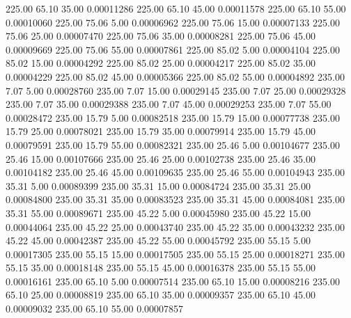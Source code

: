     225.00     65.10     35.00     0.00011286
    225.00     65.10     45.00     0.00011578
    225.00     65.10     55.00     0.00010060
    225.00     75.06      5.00     0.00006962
    225.00     75.06     15.00     0.00007133
    225.00     75.06     25.00     0.00007470
    225.00     75.06     35.00     0.00008281
    225.00     75.06     45.00     0.00009669
    225.00     75.06     55.00     0.00007861
    225.00     85.02      5.00     0.00004104
    225.00     85.02     15.00     0.00004292
    225.00     85.02     25.00     0.00004217
    225.00     85.02     35.00     0.00004229
    225.00     85.02     45.00     0.00005366
    225.00     85.02     55.00     0.00004892
    235.00      7.07      5.00     0.00028760
    235.00      7.07     15.00     0.00029145
    235.00      7.07     25.00     0.00029328
    235.00      7.07     35.00     0.00029388
    235.00      7.07     45.00     0.00029253
    235.00      7.07     55.00     0.00028472
    235.00     15.79      5.00     0.00082518
    235.00     15.79     15.00     0.00077738
    235.00     15.79     25.00     0.00078021
    235.00     15.79     35.00     0.00079914
    235.00     15.79     45.00     0.00079591
    235.00     15.79     55.00     0.00082321
    235.00     25.46      5.00     0.00104677
    235.00     25.46     15.00     0.00107666
    235.00     25.46     25.00     0.00102738
    235.00     25.46     35.00     0.00104182
    235.00     25.46     45.00     0.00109635
    235.00     25.46     55.00     0.00104943
    235.00     35.31      5.00     0.00089399
    235.00     35.31     15.00     0.00084724
    235.00     35.31     25.00     0.00084800
    235.00     35.31     35.00     0.00083523
    235.00     35.31     45.00     0.00084081
    235.00     35.31     55.00     0.00089671
    235.00     45.22      5.00     0.00045980
    235.00     45.22     15.00     0.00044064
    235.00     45.22     25.00     0.00043740
    235.00     45.22     35.00     0.00043232
    235.00     45.22     45.00     0.00042387
    235.00     45.22     55.00     0.00045792
    235.00     55.15      5.00     0.00017305
    235.00     55.15     15.00     0.00017505
    235.00     55.15     25.00     0.00018271
    235.00     55.15     35.00     0.00018148
    235.00     55.15     45.00     0.00016378
    235.00     55.15     55.00     0.00016161
    235.00     65.10      5.00     0.00007514
    235.00     65.10     15.00     0.00008216
    235.00     65.10     25.00     0.00008819
    235.00     65.10     35.00     0.00009357
    235.00     65.10     45.00     0.00009032
    235.00     65.10     55.00     0.00007857
